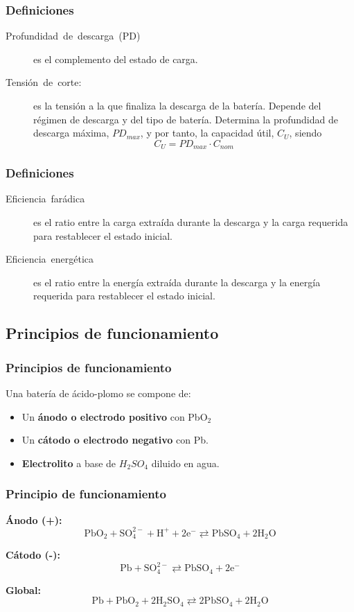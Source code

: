 \documentclass[serif, xcolor=dvipsnames]{beamer}
\begin{document}
\begin{frame}
\frametitle{Definiciones}
\begin{description}
\item [{Profundidad~de~descarga~(PD)}] es el complemento del estado
de carga.
\item [{Tensión~de~corte:}] es la tensión a la que finaliza la descarga
de la batería. Depende del régimen de descarga y del tipo de batería.
Determina la profundidad de descarga máxima, $PD_{max}$, y por tanto,
la capacidad útil, $C_{U}$, siendo \[
C_{U}=PD_{max}\cdot C_{nom}\]

\end{description}

\end{frame}

\begin{frame}
\frametitle{Definiciones}
\begin{description}
\item [{Eficiencia~farádica}] es el ratio entre la carga extraída durante
la descarga y la carga requerida para restablecer el estado inicial.
\item [{Eficiencia~energética}] es el ratio entre la energía extraída
durante la descarga y la energía requerida para restablecer el estado
inicial.
\end{description}

\end{frame}

\subsection{Principios de funcionamiento}


\begin{frame}
\frametitle{Principios de funcionamiento}

Una batería de ácido-plomo se compone de:
\begin{itemize}
\item Un \textbf{ánodo o electrodo positivo} con PbO$_{\text{2}}$
\item Un \textbf{cátodo o electrodo negativo} con Pb.
\item \textbf{Electrolito} a base de $H_{2}SO_{4}$ diluido en agua.
\end{itemize}

\end{frame}

\begin{frame}
\frametitle{Principio de funcionamiento}

\textbf{Ánodo (+):}\[
\mathrm{PbO_{2}+SO_{4}^{2-}+H^{+}+2e^{-}\rightleftarrows PbSO_{4}+2H_{2}O}\]


\textbf{Cátodo (-):}\[
\mathrm{Pb+SO_{4}^{2-}\rightleftarrows PbSO_{4}+2e^{-}}\]


\textbf{Global:}\[
\mathrm{Pb+PbO_{2}+2H_{2}SO_{4}\rightleftarrows2PbSO_{4}+2H_{2}O}\]



\end{frame}
\end{document}
